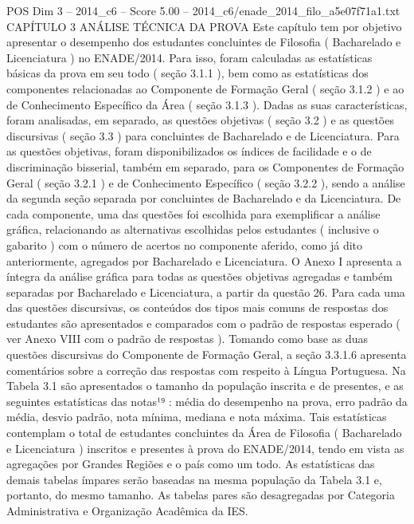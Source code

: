 \begin{textsample}{POS Dim 3 – 2014\_c6 – Score 5.00 – 2014\_c6/enade\_2014\_filo\_a5e07f71a1.txt}  \label{ex:f3_pos_040}
CAPÍTULO 3 ANÁLISE TÉCNICA DA PROVA Este capítulo tem por objetivo apresentar o desempenho dos estudantes concluintes de Filosofia ( Bacharelado e Licenciatura ) no ENADE/2014.
Para isso, foram calculadas as estatísticas básicas da prova em seu todo ( seção 3.1.1 ), bem como as estatísticas dos componentes relacionadas ao Componente de Formação Geral ( seção 3.1.2 ) e ao de Conhecimento Específico da Área ( seção 3.1.3 ).
Dadas as suas características, foram analisadas, em separado, as questões objetivas ( seção 3.2 ) e as questões discursivas ( seção 3.3 ) para concluintes de Bacharelado e de Licenciatura.
Para as questões objetivas, foram disponibilizados os índices de facilidade e o de discriminação bisserial, também em separado, para os Componentes de Formação Geral ( seção 3.2.1 ) e de Conhecimento Específico ( seção 3.2.2 ), sendo a análise da segunda seção separada por concluintes de Bacharelado e da Licenciatura.
De cada componente, uma das questões foi escolhida para exemplificar a análise gráfica, relacionando as alternativas escolhidas pelos estudantes ( inclusive o gabarito ) com o número de acertos no componente aferido, como já dito anteriormente, agregados por Bacharelado e Licenciatura.
O Anexo I apresenta a íntegra da análise gráfica para todas as questões objetivas agregadas e também separadas por Bacharelado e Licenciatura, a partir da questão 26.
Para cada uma das questões discursivas, os conteúdos dos tipos mais comuns de respostas dos estudantes são apresentados e comparados com o padrão de respostas esperado ( ver Anexo VIII com o padrão de respostas ).
Tomando como base as duas questões discursivas do Componente de Formação Geral, a seção 3.3.1.6 apresenta comentários sobre a correção das respostas com respeito à Língua Portuguesa.
Na Tabela 3.1 são apresentados o tamanho da população inscrita e de presentes, e as seguintes estatísticas das notas¹⁹ : média do desempenho na prova, erro padrão da média, desvio padrão, nota mínima, mediana e nota máxima.
Tais estatísticas contemplam o total de estudantes concluintes da Área de Filosofia ( Bacharelado e Licenciatura ) inscritos e presentes à prova do ENADE/2014, tendo em vista as agregações por Grandes Regiões e o país como um todo.
As estatísticas das demais tabelas ímpares serão baseadas na mesma população da Tabela 3.1 e, portanto, do mesmo tamanho.
As tabelas pares são desagregadas por Categoria Administrativa e Organização Acadêmica da IES.

\end{textsample}
